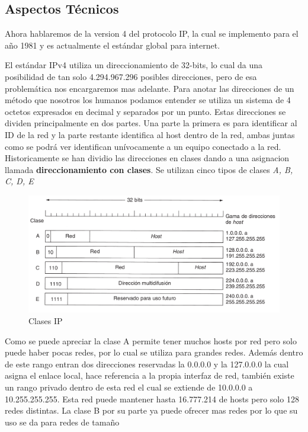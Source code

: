 \documentclass[11pt,a4paper]{article}
\begin{document}
\subsection{Aspectos Técnicos}
Ahora hablaremos de la version 4 del protocolo IP, la cual se implemento para el año 1981 y es 
actualmente el estándar global para internet.\par
El estándar IPv4 utiliza un direccionamiento de 32-bits, lo cual da una posibilidad de tan solo 
4.294.967.296 posibles direcciones, pero de esa problemática nos encargaremos mas adelante. Para 
anotar las direcciones de un método que nosotros los humanos podamos entender se utiliza un sistema 
de 4 octetos expresados en decimal y separados por un punto. Estas direcciones se dividen 
principalmente en dos partes. Una parte la primera es para identificar al ID de la red y la parte
restante identifica al host dentro de la red, ambas juntas como se podrá ver identifican 
unívocamente a un equipo conectado a la red. Historicamente se han dividio las direcciones en clases
dando a una asignacion llamada \textbf{direccionamiento con clases}. Se utilizan cinco tipos de 
clases \emph{A, B, C, D, E}
\begin{figure}[h!]
 \centering
 \includegraphics[width=1\textwidth]{clasesIP.png}
 \caption[Clases IP]{Clases IP}
\end{figure}\par
Como se puede apreciar la clase A permite tener muchos hosts por red pero solo puede haber pocas 
redes, por lo cual se utiliza para grandes redes. Además dentro de este rango entran dos direcciones 
reservadas la 0.0.0.0 y la 127.0.0.0 la cual asigna el enlace local, hace referencia a la propia 
interfaz de red, también existe un rango privado dentro de esta red el cual se extiende de 10.0.0.0 
a 10.255.255.255. Esta red puede mantener hasta 16.777.214 de hosts pero solo 128 redes distintas.
La clase B por su parte ya puede ofrecer mas redes por lo que su uso se da para redes de tamaño 
\end{document}
